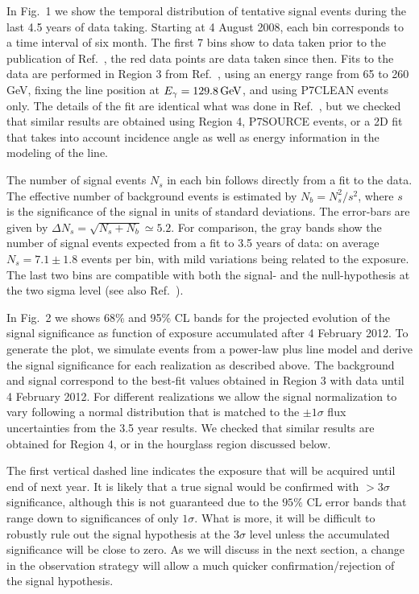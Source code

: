 \documentclass[aps,prd,superscriptaddress,showpacs,nofootinbib,fixlfloat, 12pt]{revtex4-1}
\begin{document}
In Fig.~1 we show the temporal distribution of tentative signal events 
during the last 4.5 years of data taking.
Starting at 4 August 2008, each bin corresponds to a time interval
of six month. The first 7 bins show to data taken prior to the
publication of Ref.~\cite{Bringmann:2012}, the red data points are data taken
since then.  Fits to the data are performed in Region 3 from
Ref.~\cite{Weniger:2012}, using an energy range from 65 to 260 GeV, fixing the
line position at $E_\gamma=129.8\rm\,GeV$, and using P7CLEAN events only. The
details of the fit are identical what was done in Ref.~\cite{Weniger:2012},
but we checked that similar results are obtained using Region 4,
P7SOURCE events, or a 2D fit that takes into account incidence angle as well
as energy information in the modeling of the line. 

The number of signal events $N_s$ in each bin follows directly from a fit to
the data. The effective number of background events is estimated by $N_b =
N_s^2/s^2$, where $s$ is the significance of the signal in units of
standard deviations. The error-bars are
given by $\Delta N_s = \sqrt{N_s+N_b}\simeq5.2$. For comparison, the gray
bands show the number of signal events expected from a fit to 3.5 years of
data: on average $N_s=7.1\pm 1.8$ events per bin, with
mild variations being related to the exposure. The last two
bins are compatible with both the signal- and the null-hypothesis at the two
sigma level (see also Ref.~\cite{Weniger:2013dya}). \medskip

In Fig.~2 we shows 68\% and 95\% CL bands for the projected evolution of the signal significance as
function of exposure accumulated after 4 February 2012. 
To generate the plot, we simulate events from a
power-law plus line model and derive the signal significance for each
realization as described above. The background and signal correspond to the
best-fit values obtained in Region 3 with data until 4 February 2012.  For
different realizations we allow the signal normalization to vary following a
normal distribution that is matched to the $\pm1\sigma$
flux uncertainties from the 3.5 year results. We checked that similar results
are obtained for Region 4, or in the hourglass region discussed below.

The first vertical dashed line indicates the exposure that will be acquired
until end of next year. It is likely that a true signal would be confirmed
with $>3\sigma$ significance, although this is not guaranteed due to the
$95\%$ CL error bands that range down to significances of only $1\sigma$. What
is more, it will be difficult to robustly rule out the signal hypothesis at
the $3\sigma$ level unless the accumulated significance will be close to zero.
As we will discuss in the next section, a change in the observation strategy
will allow a much quicker confirmation/rejection of the signal hypothesis.
\end{document}

